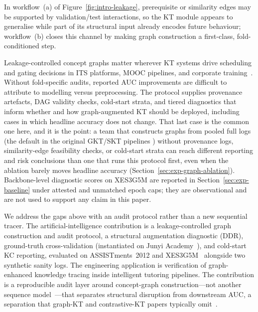 \documentclass[preprint,10pt,doubleblind]{elsarticle}
\newcommand{\DDR}{\textsc{DDR}}
\begin{document}
In workflow~(a) of Figure~\ref{fig:intro-leakage}, prerequisite or similarity
edges may be supported by validation/test interactions, so the KT module
appears to generalise while part of its structural input already encodes future
behaviour; workflow~(b) closes this channel by making graph construction a
first-class, fold-conditioned step.

Leakage-controlled concept graphs matter wherever KT systems drive
scheduling and gating decisions in ITS platforms, MOOC pipelines, and
corporate training~\cite{heffernan2006assist,junyi_dataset,choi2020ednet,xes3g5m2023}.
Without fold-specific audits, reported AUC improvements are difficult to
attribute to modelling versus preprocessing. The protocol supplies provenance
artefacts, DAG validity checks, cold-start strata, and tiered diagnostics that
inform whether and how graph-augmented KT should be deployed, including cases
in which headline accuracy does not change. That last case is the common one
here, and it is the point: a team that constructs graphs from pooled full logs
(the default in the original GKT/SKT pipelines
\cite{nakagawa2019gkt,tong2020skt}) without provenance logs, similarity-edge
feasibility checks, or cold-start strata can reach different reporting and risk
conclusions than one that runs this protocol first, even when the ablation
barely moves headline accuracy
(Section~\ref{sec:exp-graph-ablation}). Backbone-level diagnostic scores on
XES3G5M are reported in Section~\ref{sec:exp-baseline} under attested and
unmatched epoch caps; they are observational and are not used to support any
claim in this paper.

We address the gaps above with an audit protocol rather than a new sequential
tracer. The artificial-intelligence contribution is a leakage-controlled graph
construction and audit protocol, a structural augmentation diagnostic
(\DDR{}), ground-truth cross-validation (instantiated on Junyi
Academy~\cite{junyi_dataset,chang2015junyi}), and cold-start KC
reporting, evaluated on ASSISTments~2012 and
XES3G5M~\cite{xes3g5m2023} alongside two synthetic sanity logs. The
engineering application is verification of graph-enhanced knowledge tracing
inside intelligent tutoring pipelines. The contribution is a reproducible
audit layer around concept-graph
construction---not another sequence model~\cite{abdelrahman2023kt_survey,liu2022pykt}---that
separates structural disruption from downstream AUC, a separation that graph-KT and
contrastive-KT papers typically omit~\cite{nakagawa2019gkt,lee2022cl4kt}.
\end{document}
